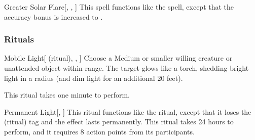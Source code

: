 \lowercase{\hypertarget{spell:Greater Solar Flare}{}}\label{spell:Greater Solar Flare}
\begin{freeability}[\nth{7}]{\hypertarget{spell:Greater Solar Flare}{Greater Solar Flare}}[, , ]
This spell functions like the  spell, except that the accuracy bonus is increased to .
\end{freeability}
\vspace{0.25em}



\subsubsection{Rituals}


\lowercase{\hypertarget{spell:Mobile Light}{}}\label{spell:Mobile Light}
\begin{attuneability}[\nth{1}]{\hypertarget{spell:Mobile Light}{Mobile Light}}[ (ritual), , ]
Choose a Medium or smaller willing creature or unattended object within \rngclose range.
The target glows like a torch, shedding bright light in a \areamed radius (and dim light for an additional 20 feet).

This ritual takes one minute to perform.
\end{attuneability}
\vspace{0.25em}



\lowercase{\hypertarget{spell:Permanent Light}{}}\label{spell:Permanent Light}
\begin{freeability}[\nth{2}]{\hypertarget{spell:Permanent Light}{Permanent Light}}[, ]
This ritual functions like the  ritual, except that it loses the  (ritual) tag and the effect lasts permanently.
This ritual takes 24 hours to perform, and it requires 8 action points from its participants.
\end{freeability}
\vspace{0.25em}


